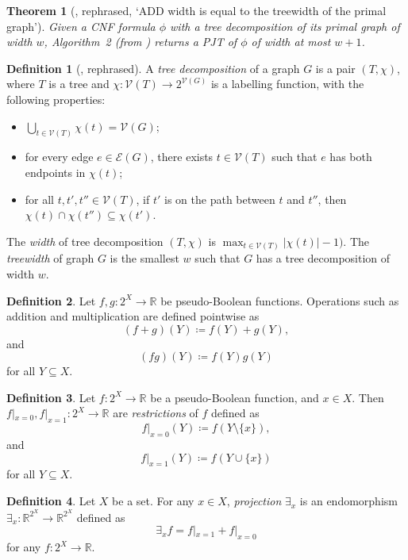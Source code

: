 \documentclass{article}
\newtheorem{theorem}{Theorem}
\theoremstyle{definition}
\newtheorem{definition}{Definition}
\theoremstyle{remark}
\begin{document}
\begin{theorem}[\cite{DBLP:conf/cp/DudekPV20}, rephrased, `ADD width is equal
  to the treewidth of the primal graph']
  Given a CNF formula $\phi$ with a tree decomposition of its primal graph of
  width $w$, Algorithm~2 (from \cite{DBLP:conf/cp/DudekPV20}) returns a
  PJT of $\phi$ of width at most $w+1$.
\end{theorem}

\begin{definition}[\cite{DBLP:journals/jct/RobertsonS84}, rephrased]
  A \emph{tree decomposition} of a graph $G$ is a pair $(T, \chi)$, where $T$ is
  a tree and $\chi\colon \mathcal{V}(T) \to 2^{\mathcal{V}(G)}$ is a labelling
  function, with the following properties:
  \begin{itemize}
  \item $\bigcup_{t \in \mathcal{V}(T)} \chi(t) = \mathcal{V}(G)$;
  \item for every edge $e \in \mathcal{E}(G)$, there exists $t \in
    \mathcal{V}(T)$ such that $e$ has both endpoints in $\chi(t)$;
  \item for all $t, t', t'' \in \mathcal{V}(T)$, if $t'$ is on the path between
    $t$ and $t''$, then $\chi(t) \cap \chi(t'') \subseteq \chi(t')$.
  \end{itemize}
  The \emph{width} of tree decomposition $(T, \chi)$ is $\max_{t \in
    \mathcal{V}(T)} |\chi(t)| - 1)$. The \emph{treewidth} of graph $G$ is the
  smallest $w$ such that $G$ has a tree decomposition of width $w$.
\end{definition}

\begin{definition}
  Let $f, g\colon 2^X \to \mathbb{R}$ be pseudo-Boolean functions. Operations
  such as addition and multiplication are defined pointwise as
  \[
    (f+g)(Y) \coloneqq f(Y)+g(Y),
  \]
  and
  \[
    (fg)(Y) \coloneqq f(Y)g(Y)
  \]
  for all $Y \subseteq X$.
\end{definition}

\begin{definition}
  Let $f\colon 2^X \to \mathbb{R}$ be a pseudo-Boolean function, and $x \in X$.
  Then $f|_{x=0}, f|_{x=1}\colon 2^X \to \mathbb{R}$ are \emph{restrictions} of
  $f$ defined as
  \[
    f|_{x=0}(Y) \coloneqq f(Y \setminus \{x\}),
  \]
  and
  \[
    f|_{x=1}(Y) \coloneqq f(Y \cup \{x\})
  \]
  for all $Y \subseteq X$.
\end{definition}

\begin{definition} \label{def:projection}
  Let $X$ be a set. For any $x \in X$, \emph{projection} $\exists_x$ is an
  endomorphism $\exists_x\colon \mathbb{R}^{2^X} \to \mathbb{R}^{2^X}$ defined
  as
  \[
    \exists_xf = f|_{x=1} + f|_{x=0}
  \]
  for any $f\colon 2^X \to \mathbb{R}$.
\end{definition}
\end{document}
